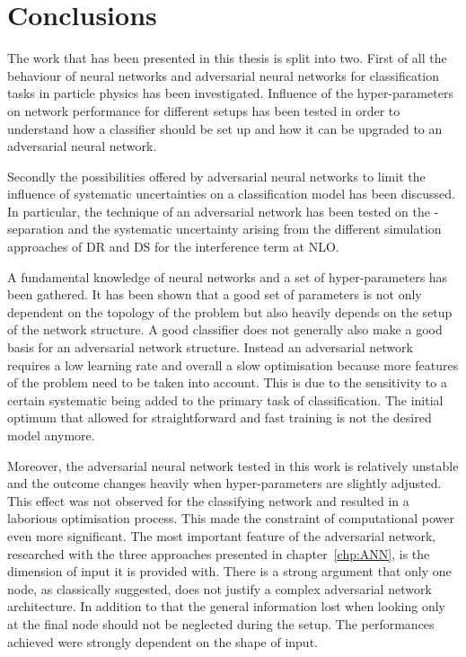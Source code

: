 \chapter{Conclusions}

The work that has been presented in this thesis is split into two. First of all the behaviour of neural networks and adversarial neural networks for classification tasks in particle physics has been investigated. Influence of the hyper-parameters on network performance for different setups has been tested in order to understand how a classifier should be set up and how it can be upgraded to an adversarial neural network.

Secondly the possibilities offered by adversarial neural networks to limit the influence of systematic uncertainties on a classification model has been discussed. In particular, the technique of an adversarial network has been tested on the \tW-\ttbar separation and the systematic uncertainty arising from the different simulation approaches of DR and DS for the interference term at NLO.

A fundamental knowledge of neural networks and a set of hyper-parameters has been gathered. It has been shown that a good set of parameters is not only dependent on the topology of the problem but also heavily depends on the setup of the network structure. A good classifier does not generally also make a good basis for an adversarial network structure. Instead an adversarial network requires a low learning rate and overall a slow optimisation because more features of the problem need to be taken into account. This is due to the sensitivity to a certain systematic being added to the primary task of classification. The initial optimum that allowed for straightforward and fast training is not the desired model anymore.

Moreover, the adversarial neural network tested in this work is relatively unstable and the outcome changes heavily when hyper-parameters are slightly adjusted. This effect was not observed for the classifying network and resulted in a laborious optimisation process. This made the constraint of computational power even more significant.
The most important feature of the adversarial network, researched with the three approaches presented in chapter~\ref{chp:ANN}, is the dimension of input it is provided with. There is a strong argument that only one node, as classically suggested, does not justify a complex adversarial network architecture. In addition to that the general information lost when looking only at the final node should not be neglected during the setup. The performances achieved were strongly dependent on the shape of input.

